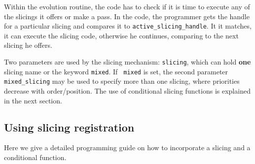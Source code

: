 Within the evolution routine, the code has to check if it is time to
execute any of the slicings it offers or make a pass. In the code, the 
programmer gets the handle for a particular slicing and compares it
to {\tt active\_slicing\_handle}. It it matches, it can execute the
slicing code, otherwise he continues, comparing to the next slicing he offers.

Two parameters are used by the slicing mechanism: {\tt slicing}, which 
can hold {\bf one} slicing name or the keyword {\tt mixed}. If {\tt
mixed} is set, the second parameter {\tt mixed\_slicing} may be used to 
specify more than one slicing, where priorities decrease with order/position.
The use of conditional slicing functions is explained in the next section.


\subsection{Using slicing registration}
Here we give a detailed programming guide on how to incorporate a slicing and 
a conditional function.
